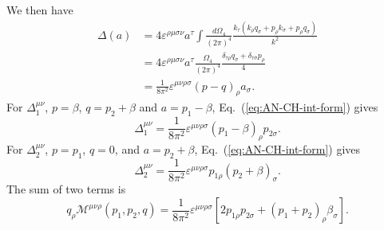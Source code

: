 We then have
\begin{equation}\label{eq:AN-CH-int-form}
\begin{aligned}
	\Delta(a) 
	&= 4 \varepsilon^{\rho\mu\sigma\nu} a^\tau \int \frac{d \Omega_4}{(2\pi)^4} \frac{k_\tau (k_\rho q_\sigma + p_\rho k_\sigma + p_\rho q_\sigma)}{k^2} \\
	&= 4 \varepsilon^{\rho\mu\sigma\nu} a^\tau \frac{\Omega_4}{(2\pi)^4} \frac{\delta_{\tau\rho}q_\sigma + \delta_{\tau\sigma}p_\rho}{4} \\
	&= \frac{1}{8\pi^2} \varepsilon^{\mu\nu\rho\sigma} (p-q)_\rho a_\sigma.
\end{aligned}
\end{equation}
For $\Delta_{1}^{\mu\nu}$, $p=\beta$, $q=p_2+\beta$ and $a=p_1-\beta$, Eq.~(\ref{eq:AN-CH-int-form}) gives
\begin{equation}
	\Delta^{\mu\nu}_1 = \frac{1}{8\pi^2} \varepsilon^{\mu\nu\rho\sigma} (p_1-\beta)_\rho p_{2\sigma}.
\end{equation}
For $\Delta_2^{\mu\nu}$, $p=p_1$, $q=0$, and $a=p_2+\beta$, Eq.~(\ref{eq:AN-CH-int-form}) gives
\begin{equation}
	\Delta^{\mu\nu}_2 = \frac{1}{8\pi^2} \varepsilon^{\mu\nu\rho\sigma} p_{1\rho}(p_2+\beta)_\sigma.
\end{equation}
The sum of two terms is
\begin{equation}
	q_\rho \mathcal{M}^{\mu\nu\rho}(p_1,p_2,q) = \frac{1}{8\pi^2} \varepsilon^{\mu\nu\rho\sigma} \left[2 p_{1\rho} p_{2\sigma} + (p_1+p_2)_\rho \beta_\sigma \right].
\end{equation}

